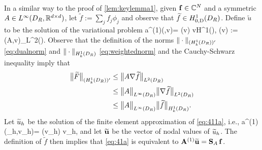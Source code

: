 \

In a similar way to the proof of \cref{lem:keylemma1}, given $\mathbf{f} \in \mathbb C^N$ and a symmetric $A\in L^\infty(D_{R}, \mathbb R^{d\times d})$, let $\widetilde{f} := \sum_j f_j \phi_j$ and observe that $\widetilde{f} \in \HozDDR$. Define $\widetilde{u}$ to be the solution of the variational problem 
\beq\label{eq:411a}
a^{(1)}(,v)= (v) \quad{} v\in H^1(\Omega),
\quad{} \quad
 (v) :=(A\nabla{},\nabla v)_{L^2(\Omega)}.
\eeq
Observe that the definition of the norms $\|\cdot\|_{(\HokDR)'}$ \cref{eq:dualnorm} and $\|\cdot\|_{\HokDR}$ \cref{eq:weightednorm} and the Cauchy-Schwarz inequality imply that
\begin{align}
\big\| \widetilde{F}\big\|_{(\HokDR)'}&\leq \big\|A\nabla \widetilde{f}\big\|_{\LtDR}\nonumber\\
&\leq \big\|A\big\|_{L^\infty(\DR)} \big\|\nabla \widetilde{f}\big\|_{\LtDR}\label{eq:Fbounda}\\
&\leq \big\|A\big\|_{L^\infty(\DR)} \big\| \widetilde{f}\big\|_{\HokDR}.\label{eq:Fbound}
\end{align}
Let $\widetilde{u}_h$ be the solution of the finite element approximation of \cref{eq:411a}, i.e.,
\beq\label{eq:41a}
a^{(1)}(\tu_h,v_h)= (v_h) \quad{} v_h\in \Vhp,
\eeq
and let $\widetilde{\mathbf{u}}$ be the vector of nodal values of $\widetilde{u}_h$. The definition of $\widetilde{f}$ then implies that \cref{eq:41a} is equivalent to $\mathbf{A}^{(1)} \widetilde{\mathbf{u}} = \mathbf{S}_A\,\mathbf{f}$. 

